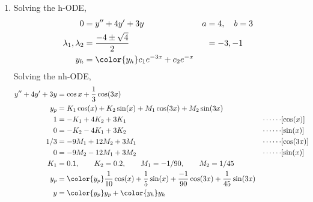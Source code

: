 \begin{enumerate}
    \item Solving the h-ODE,
          \begin{align}
              0                        & = y'' + 4y' + 3y                         & a & = 4, \quad b = 3 \\
              \lambda_{1}, \lambda_{2} & = \frac{-4 \pm \sqrt{4}}{2}              &   & = -3, -1         \\
              y_{h}                    & = \color{y_h} c_{1}e^{-3x} + c_{2}e^{-x}
          \end{align}
          Solving the nh-ODE,
          \begin{align}
              y'' + 4y' + 3y & = \cos x + \frac{1}{3}\cos(3x)                                                                   \\
              y_{p}          & = K_{1} \cos(x) + K_{2} \sin(x) + M_{1}\cos(3x) + M_{2}\sin(3x)                                  \\
              1              & = -K_{1} + 4K_{2} + 3K_{1}                                           & \cdots\cdots & [\cos(x)]  \\
              0              & = -K_{2} - 4K_{1} + 3K_{2}                                           & \cdots\cdots & [\sin(x)]  \\
              1/3            & = -9M_{1} + 12M_{2} + 3M_{1}                                         & \cdots\cdots & [\cos(3x)] \\
              0              & = -9M_{2} - 12M_{1} + 3M_{2}                                         & \cdots\cdots & [\sin(x)]  \\
              K_{1}          & = 0.1, \qquad K_{2} = 0.2, \qquad M_{1} = -1/90, \qquad M_{2} = 1/45                             \\
              y_{p}          & = \color{y_p} \frac{1}{10} \cos(x) + \frac{1}{5} \sin(x) +
              \frac{-1}{90}\cos(3x) + \frac{1}{45}\sin(3x)                                                                      \\
              y              & = {\color{y_p} y_{p}} + {\color{y_h} y_{h}}
          \end{align}


\end{enumerate}
